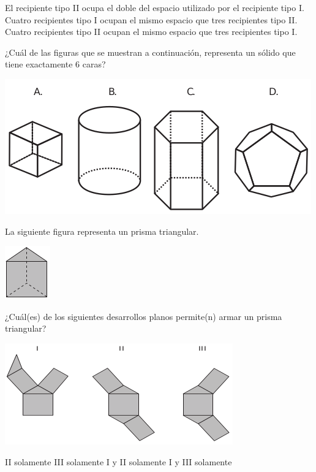 \documentclass[10pt,letterpaper,addpoints]{exam}
\begin{document}
\begin{multicols}{2}
\begin{questions}
\begin{choices}
 \choice El recipiente tipo II ocupa el doble del espacio utilizado por el recipiente tipo I.
 \choice Cuatro recipientes tipo I ocupan el mismo espacio que tres recipientes tipo II.
 \choice Cuatro recipientes tipo II ocupan el mismo espacio que tres recipientes tipo I.
 \end{choices}
 \question ¿Cuál de las figuras que se muestran a continuación, representa un sólido que tiene exactamente 6 caras?
 \begin{center}
 \includegraphics[scale=.45]{Images/Pantallazo-8.png} 
 \end{center}
 \question La siguiente figura representa un prisma triangular.
 \begin{center}
 \includegraphics[scale=.75]{Images/Pantallazo-9.png} 
 \end{center}
 ¿Cuál(es) de los siguientes desarrollos planos permite(n) armar un prisma triangular?
 \begin{center}
 \includegraphics[scale=.65]{Images/Pantallazo-10.png} 
 \end{center}
 \begin{choices}
 \choice II solamente
 \choice III solamente
 \CorrectChoice I y II solamente
 \choice I y III solamente
 \end{choices}
 \end{questions}
\end{multicols}
\end{document}
